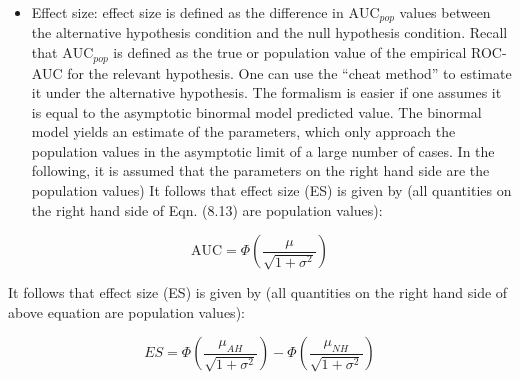\documentclass[
]{book}
\providecommand{\tightlist}{%
  \setlength{\itemsep}{0pt}\setlength{\parskip}{0pt}}
\begin{document}
\begin{itemize}
\tightlist
\item
  Effect size: effect size is defined as the difference in \(\text{AUC}_{pop}\) values between the alternative hypothesis condition and the null hypothesis condition. Recall that \(\text{AUC}_{pop}\) is defined as the true or population value of the empirical ROC-AUC for the relevant hypothesis. One can use the ``cheat method'' to estimate it under the alternative hypothesis. The formalism is easier if one assumes it is equal to the asymptotic binormal model predicted value. The binormal model yields an estimate of the parameters, which only approach the population values in the asymptotic limit of a large number of cases. In the following, it is assumed that the parameters on the right hand side are the population values)
  It follows that effect size (ES) is given by (all quantities on the right hand side of Eqn. (8.13) are population values):
\end{itemize}

\begin{equation*} 
\text{AUC} = \Phi\left ( \frac{ \mu }{\sqrt{ 1 + \sigma^2}} \right )
\end{equation*}

It follows that effect size (ES) is given by (all quantities on the right hand side of above equation are population values):

\begin{equation*} 
ES = \Phi\left ( \frac{\mu_{AH}}{\sqrt{1+\sigma^2}} \right ) - \Phi\left ( \frac{\mu_{NH}}{\sqrt{1+\sigma^2}} \right )
\end{equation*}
\end{document}
